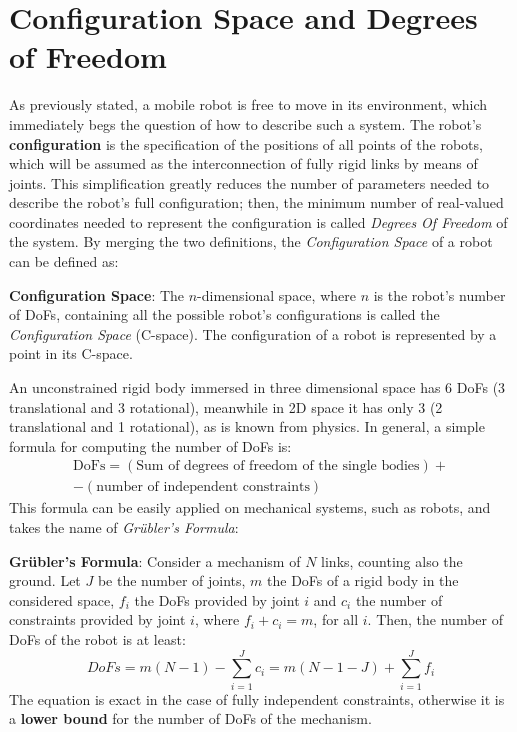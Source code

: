     \section{Configuration Space and Degrees of Freedom}
    As previously stated, a mobile robot is free to move in its environment, which immediately begs the question of how to describe such a system.
     The robot’s \textbf{configuration} is the specification of the positions of all points of the robots, which will be assumed as the interconnection of fully rigid links by means of joints. This simplification greatly reduces the number of parameters needed to describe the robot's full configuration; then, the minimum number of real-valued coordinates needed to represent the configuration is called \textit{Degrees Of Freedom} of the system. By merging the two definitions, the \textit{Configuration Space} of a robot can be defined as:
    \begin{definition}
        \textbf{Configuration Space}: The $n$-dimensional space, where $n$ is the robot's number of DoFs, containing all the possible robot's configurations is called the \textit{Configuration Space} (C-space). The configuration of a robot is represented by a point in its C-space.
    \end{definition}
    An unconstrained rigid body immersed in three dimensional space has 6 DoFs (3 translational and 3 rotational), meanwhile in 2D space it has only 3 (2 translational and 1 rotational), as is known from physics. In general, a simple formula for computing the number of DoFs is:
    \begin{gather*}
        \text{DoFs}=(\text{Sum of degrees of freedom of the single bodies})+\\-(\text{number of independent constraints})
    \end{gather*}
    This formula can be easily applied on mechanical systems, such as robots, and takes the name of \textit{Gr\"{u}bler's Formula}:
    \begin{definition}
        \textbf{Gr\"{u}bler's Formula}: Consider a mechanism of $N$ links, counting also the ground. Let $J$ be the number of joints, $m$ the DoFs of a rigid body in the considered space, $f_i$ the DoFs provided by joint $i$ and $c_i$ the number of constraints provided by joint $i$, where $f_i+c_i=m$, for all $i$. Then, the number of DoFs of the robot is at least: 
        \begin{equation}\label{Grubler's formula}
            DoFs = m(N-1)-\sum_{i=1}^{J}c_i=m(N-1-J)+\sum_{i=1}^{J}f_i
        \end{equation}
        The equation is exact in the case of fully independent constraints, otherwise it is a \textbf{lower bound} for the number of DoFs of the mechanism.
    \end{definition}
